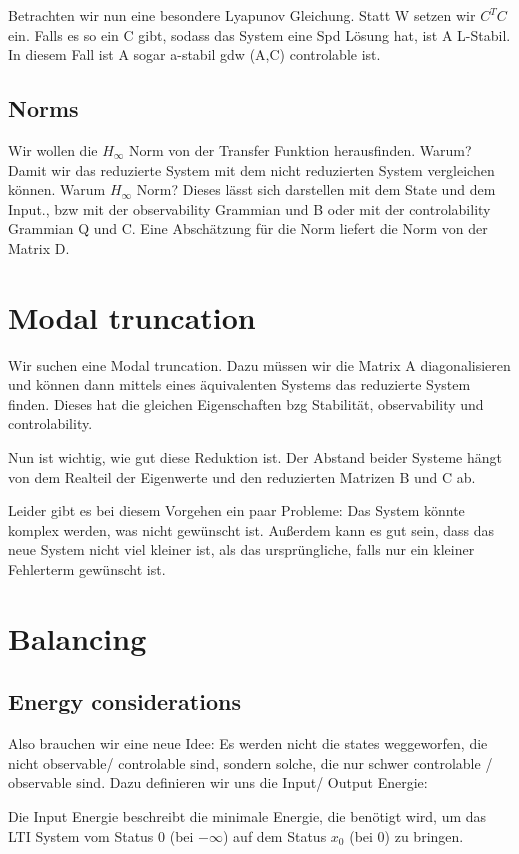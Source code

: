 \documentclass[]{article}
\begin{document}
 Betrachten wir nun eine besondere Lyapunov Gleichung. Statt W setzen wir $C^T C$ ein. Falls es so ein C gibt, sodass das System eine Spd Lösung hat, ist A L-Stabil. In diesem Fall ist A sogar a-stabil gdw (A,C) controlable ist. 
 
 \subsection{Norms}
 Wir wollen die $H_{\infty}$ Norm von der Transfer Funktion herausfinden. Warum? Damit wir das reduzierte System mit dem nicht reduzierten System vergleichen können. Warum $H_{\infty}$ Norm? Dieses lässt sich darstellen mit dem State und dem Input., bzw mit der observability Grammian und B oder mit der controlability Grammian Q und C. Eine Abschätzung für die Norm liefert die Norm von der Matrix D. 
 
 \section{Modal truncation}
 Wir suchen eine Modal truncation. Dazu müssen wir die Matrix A diagonalisieren und können dann mittels eines äquivalenten Systems das reduzierte System finden. Dieses hat die gleichen Eigenschaften bzg Stabilität, observability und controlability. 
 
Nun ist wichtig, wie gut diese Reduktion ist. Der Abstand beider Systeme hängt von dem Realteil der Eigenwerte und den reduzierten Matrizen B und C ab. 

Leider gibt es bei diesem Vorgehen ein paar Probleme: Das System könnte komplex werden, was nicht gewünscht ist. Außerdem  kann es gut sein, dass das neue System nicht viel kleiner ist, als das ursprüngliche, falls nur ein kleiner Fehlerterm gewünscht ist. 

\section{Balancing}

\subsection{Energy considerations}
Also brauchen wir eine neue Idee: Es werden nicht die states weggeworfen, die nicht observable/ controlable sind, sondern solche, die nur schwer controlable / observable sind. Dazu definieren wir uns die Input/ Output Energie: 

Die Input Energie beschreibt die minimale Energie, die benötigt wird, um das LTI System vom Status 0 (bei $- \infty$) auf dem Status $x_0$ (bei 0) zu bringen. 
\end{document}
